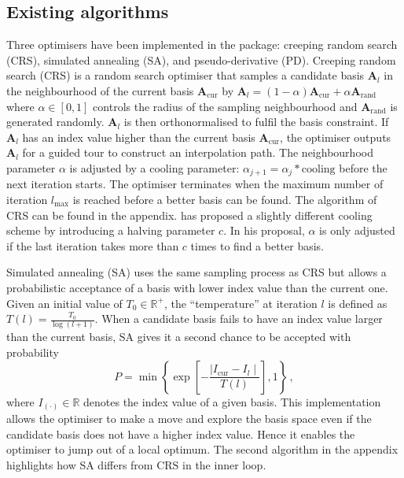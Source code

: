 \hypertarget{existing-algorithms}{%
\subsection{Existing algorithms}\label{existing-algorithms}}

Three optimisers have been implemented in the  \citep{tourr}
package: creeping random search (CRS), simulated annealing (SA), and
pseudo-derivative (PD). Creeping random search (CRS) is a random search
optimiser that samples a candidate basis \(\mathbf{A}_{l}\) in the
neighbourhood of the current basis \(\mathbf{A}_{\text{cur}}\) by
\(\mathbf{A}_{l} = (1- \alpha)\mathbf{A}_{\text{cur}} + \alpha \mathbf{A}_{\text{rand}}\)
where \(\alpha \in [0,1]\) controls the radius of the sampling
neighbourhood and \(\mathbf{A}_{\text{rand}}\) is generated randomly.
\(\mathbf{A}_{l}\) is then orthonormalised to fulfil the basis
constraint. If \(\mathbf{A}_{l}\) has an index value higher than the
current basis \(\mathbf{A}_{\text{cur}}\), the optimiser outputs
\(\mathbf{A}_{l}\) for a guided tour to construct an interpolation path.
The neighbourhood parameter \(\alpha\) is adjusted by a cooling
parameter: \(\alpha_{j+1} = \alpha_j * \text{cooling}\) before the next
iteration starts. The optimiser terminates when the maximum number of
iteration \(l_{\max}\) is reached before a better basis can be found.
The algorithm of CRS can be found in the appendix.
\citet{posse1995projection} has proposed a slightly different cooling
scheme by introducing a halving parameter \(c\). In his proposal,
\(\alpha\) is only adjusted if the last iteration takes more than \(c\)
times to find a better basis.

Simulated annealing (SA) uses the same sampling process as CRS but
allows a probabilistic acceptance of a basis with lower index value than
the current one. Given an initial value of \(T_0 \in \mathbb{R^{+}}\),
the ``temperature'' at iteration \(l\) is defined as
\(T(l) = \frac{T_0}{\log(l + 1)}\). When a candidate basis fails to have
an index value larger than the current basis, SA gives it a second
chance to be accepted with probability
\[P= \min\left\{\exp\left[-\frac{\mid I_{\text{cur}} - I_{l} \mid}{T(l)}\right],1\right\} \,,\]
where \(I_{(\cdot)} \in \mathbb{R}\) denotes the index value of a given
basis. This implementation allows the optimiser to make a move and
explore the basis space even if the candidate basis does not have a
higher index value. Hence it enables the optimiser to jump out of a
local optimum. The second algorithm in the appendix highlights how SA
differs from CRS in the inner loop.

